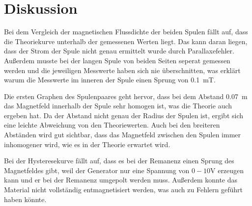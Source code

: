 \section{Diskussion}

Bei dem Vergleich der magnetischen Flussdichte der beiden Spulen fällt auf, dass
die Theoriekurve unterhalb der gemessenen Werten liegt. Das kann daran liegen, dass
der Strom der Spule nicht genau ermittelt wurde durch Parallaxefehler. Außerdem
musste bei der langen Spule von beiden Seiten seperat gemessen werden und die jeweiligen
Messwerte haben sich nie überschnitten, was erklärt warum die Messwerte im inneren
der Spule einen Sprung von \SI{0.1}{\milli\tesla}.

Die ersten Graphen des Spulenpaares geht hervor, dass bei dem Abstand \SI{0.07}{\meter}
das Magnetfeld innerhalb der Spule sehr homogen ist, was die Theorie auch ergeben hat.
Da der Abstand nicht genau der Radius der Spulen ist, ergibt sich eine leichte Abweichung
von den Theoriewerten. Auch bei den breiteren Abständen wird gut sichtbar, dass
das Magnetfeld zwischen den Spulen immer inhomogener wird, wie es in der Theorie
erwartet wird.

Bei der Hysteresekurve fällt auf, dass es bei der Remanenz einen Sprung des Magnetfeldes
gibt, weil der Generator nur eine Spannung von $0-10\si{\volt}$ erzeugen kann und
er bei der Remanenz umgepolt werden muss. Außerdem konnte das Material nicht vollständig
entmagnetisiert werden, was auch zu Fehlern geführt haben könnte.
